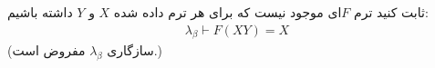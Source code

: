 ثابت کنید ترم $F$ای موجود نیست که برای هر ترم داده شده $X$ و $Y$ داشته باشیم:
\begin{gather*}
    \lambda_\beta \vdash F(XY) = X
\end{gather*}
(سازگاری $\lambda_\beta$ مفروض است.)